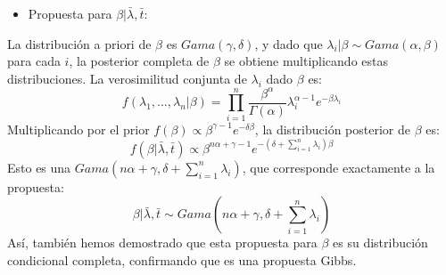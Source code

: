 \begin{itemize}
	\item Propuesta para $\beta | \bar{\lambda}, \bar{t}$:
\end{itemize}
La distribución a priori de $\beta$ es $Gama(\gamma, \delta)$, y dado que $\lambda_i | \beta \sim Gama(\alpha, \beta)$ para cada $i$, la posterior completa de $\beta$ se obtiene multiplicando estas distribuciones.
La verosimilitud conjunta de $\lambda_i$ dado $\beta$ es:
\begin{equation}
f(\lambda_1, \dots, \lambda_n | \beta) = \prod_{i=1}^n \frac{\beta^\alpha}{\Gamma(\alpha)} \lambda_i^{\alpha - 1} e^{-\beta \lambda_i}
\end{equation}
Multiplicando por el prior $f(\beta) \propto \beta^{\gamma - 1} e^{-\delta \beta}$, la distribución posterior de $\beta$ es:
\begin{equation}
f(\beta | \bar{\lambda}, \bar{t}) \propto \beta^{n \alpha + \gamma - 1} e^{-(\delta + \sum_{i=1}^n \lambda_i) \beta}
\end{equation}
Esto es una $Gama(n \alpha + \gamma, \delta + \sum_{i=1}^n \lambda_i)$, que corresponde exactamente a la propuesta:
\begin{equation}
\beta | \bar{\lambda}, \bar{t} \sim Gama(n \alpha + \gamma, \delta + \sum_{i=1}^n \lambda_i)
\end{equation}
Así, también hemos demostrado que esta propuesta para $\beta$ es su distribución condicional completa, confirmando que es una propuesta Gibbs.
